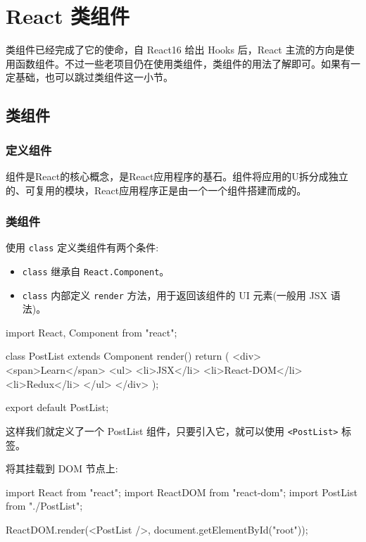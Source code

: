 \section{React 类组件}

类组件已经完成了它的使命，自 React16 给出 Hooks 后，React 主流的方向是使用函数组件。不过一些老项目仍在使用类组件，类组件的用法了解即可。如果有一定基础，也可以跳过类组件这一小节。

\subsection{类组件}

\subsubsection{定义组件}

组件是React的核心概念，是React应用程序的基石。组件将应用的U拆分成独立的、可复用的模块，React应用程序正是由一个一个组件搭建而成的。

\subsubsection*{类组件}

使用 \texttt{class} 定义类组件有两个条件:
\begin{itemize}
    \item \texttt{class} 继承自 \texttt{React.Component}。
    \item \texttt{class} 内部定义 \texttt{render} 方法，用于返回该组件的 UI 元素(一般用 JSX 语法)。
\end{itemize}

\begin{JavaScript}
import React, { Component } from "react";

class PostList extends Component {
  render() {
    return (
      <div>
        <span>Learn</span>
        <ul>
          <li>JSX</li>
          <li>React-DOM</li>
          <li>Redux</li>
        </ul>
      </div>
    );
  }
}

export default PostList;
\end{JavaScript}

这样我们就定义了一个 PostList 组件，只要引入它，就可以使用 \texttt{<PostList>} 标签。 

将其挂载到 DOM 节点上:

\begin{JavaScript}
import React from "react";
import ReactDOM from "react-dom";
import PostList from "./PostList";

ReactDOM.render(<PostList />, document.getElementById("root"));
\end{JavaScript}

